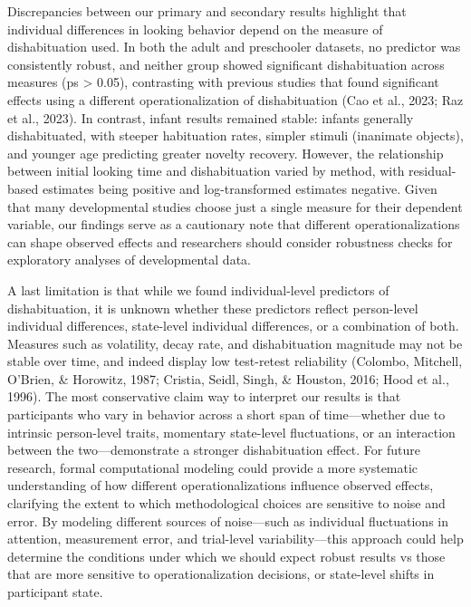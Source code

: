 \documentclass[10pt, letterpaper]{article}
\begin{document}
Discrepancies between our primary and secondary results highlight that
individual differences in looking behavior depend on the measure of
dishabituation used. In both the adult and preschooler datasets, no
predictor was consistently robust, and neither group showed significant
dishabituation across measures (ps \textgreater{} 0.05), contrasting
with previous studies that found significant effects using a different
operationalization of dishabituation (Cao et al., 2023; Raz et al.,
2023). In contrast, infant results remained stable: infants generally
dishabituated, with steeper habituation rates, simpler stimuli
(inanimate objects), and younger age predicting greater novelty
recovery. However, the relationship between initial looking time and
dishabituation varied by method, with residual-based estimates being
positive and log-transformed estimates negative. Given that many
developmental studies choose just a single measure for their dependent
variable, our findings serve as a cautionary note that different
operationalizations can shape observed effects and researchers should
consider robustness checks for exploratory analyses of developmental
data.

A last limitation is that while we found individual-level predictors of
dishabituation, it is unknown whether these predictors reflect
person-level individual differences, state-level individual differences,
or a combination of both. Measures such as volatility, decay rate, and
dishabituation magnitude may not be stable over time, and indeed display
low test-retest reliability (Colombo, Mitchell, O'Brien, \& Horowitz,
1987; Cristia, Seidl, Singh, \& Houston, 2016; Hood et al., 1996). The
most conservative claim way to interpret our results is that
participants who vary in behavior across a short span of time---whether
due to intrinsic person-level traits, momentary state-level
fluctuations, or an interaction between the two---demonstrate a stronger
dishabituation effect. For future research, formal computational
modeling could provide a more systematic understanding of how different
operationalizations influence observed effects, clarifying the extent to
which methodological choices are sensitive to noise and error. By
modeling different sources of noise---such as individual fluctuations in
attention, measurement error, and trial-level variability---this
approach could help determine the conditions under which we should
expect robust results vs those that are more sensitive to
operationalization decisions, or state-level shifts in participant
state.
\end{document}
